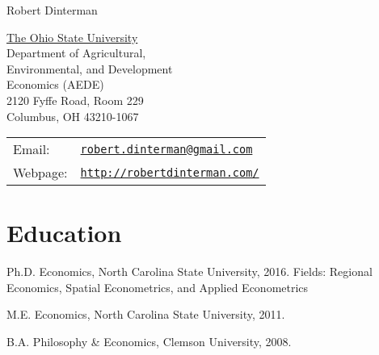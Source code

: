 \documentclass[letterpaper]{article}
\def\name{Robert Dinterman}
\renewenvironment{itemize}{
  \begin{list}{}{
    \setlength{\leftmargin}{1.5em}
  }
}{
  \end{list}
}
\begin{document}
{\huge \name}


\vspace{0.25in}

\begin{minipage}{0.45\linewidth}
  \href{http://aede.osu.edu/home}{The Ohio State University} \\
  Department of Agricultural, \\
  Environmental, and Development \\
  Economics (AEDE) \\
  2120 Fyffe Road, Room 229 \\
  Columbus, OH 43210-1067
\end{minipage}
\begin{minipage}{0.5\linewidth}
  \begin{tabular}{ll}
    Email: & \href{mailto:robert.dinterman@gmail.com}{\tt robert.dinterman@gmail.com} \\
    Webpage: & \href{http://robertdinterman.com/}{\tt http://robertdinterman.com/} \\
  \end{tabular}
\end{minipage}


% 
% 

\section*{Education}

\begin{itemize}
  \item Ph.D. Economics, North Carolina State University, 2016.
    \subitem Fields: Regional Economics, Spatial Econometrics, and Applied Econometrics

  \item M.E. Economics, North Carolina State University, 2011.

  \item B.A. Philosophy \& Economics, Clemson University, 2008.
\end{itemize}
\end{document}

